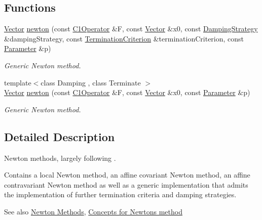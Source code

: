 \subsection*{Functions}
\begin{DoxyCompactItemize}
\item 
\hyperlink{classSpacy_1_1Vector}{Vector} \hyperlink{group__NewtonGroup_gac1e03448966c56b3a119f9bea07e6dd6_gac1e03448966c56b3a119f9bea07e6dd6}{newton} (const \hyperlink{group__SpacyGroup_ga87ae8cb0d7a567a4bb181e0a9f182620_ga87ae8cb0d7a567a4bb181e0a9f182620}{C1\+Operator} \&F, const \hyperlink{classSpacy_1_1Vector}{Vector} \&x0, const \hyperlink{namespaceSpacy_1_1Newton_ae2ba8821b209bfac2ab9190e6283cf06_ae2ba8821b209bfac2ab9190e6283cf06}{Damping\+Strategy} \&damping\+Strategy, const \hyperlink{namespaceSpacy_1_1Newton_abfa64b52531032d7a5fe6d0ec1a3cbd5_abfa64b52531032d7a5fe6d0ec1a3cbd5}{Termination\+Criterion} \&termination\+Criterion, const \hyperlink{structSpacy_1_1Newton_1_1Parameter}{Parameter} \&p)
\begin{DoxyCompactList}\small\item\em Generic Newton method. \end{DoxyCompactList}\item 
{\footnotesize template$<$class Damping , class Terminate $>$ }\\\hyperlink{classSpacy_1_1Vector}{Vector} \hyperlink{group__NewtonGroup_ga39c7915072931fafca5d3012aa6349bf_ga39c7915072931fafca5d3012aa6349bf}{newton} (const \hyperlink{group__SpacyGroup_ga87ae8cb0d7a567a4bb181e0a9f182620_ga87ae8cb0d7a567a4bb181e0a9f182620}{C1\+Operator} \&F, const \hyperlink{classSpacy_1_1Vector}{Vector} \&x0, const \hyperlink{structSpacy_1_1Newton_1_1Parameter}{Parameter} \&p)
\begin{DoxyCompactList}\small\item\em Generic Newton method. \end{DoxyCompactList}\end{DoxyCompactItemize}


\subsection{Detailed Description}
Newton methods, largely following \cite{Deuflhard2004}. 

Contains a local Newton method, an affine covariant Newton method, an affine contravariant Newton method as well as a generic implementation that admits the implementation of further termination criteria and damping strategies. \begin{DoxySeeAlso}{See also}
\hyperlink{group__NewtonGroup}{Newton Methods}, \hyperlink{group__NewtonConceptGroup}{Concepts for Newton\textquotesingle{}s method} 
\end{DoxySeeAlso}


